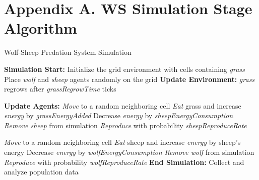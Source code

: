 \documentclass[12pt,a4paper]{article}
\begin{document}
\section*{Appendix A. WS Simulation Stage Algorithm}
\begin{algorithm}[!]
    \caption{Wolf-Sheep Predation System Simulation}\label{alg:wolf-sheep}
    \begin{algorithmic}[1]   
    \State \textbf{Simulation Start:}
    \State Initialize the grid environment with cells containing \textit{grass}
    \State Place \textit{wolf} and \textit{sheep} agents randomly on the grid
        \State \textbf{Update Environment:}
                \State \textit{grass} regrows after \textit{grassRegrowTime} ticks
            \EndIf
        \EndFor
        
        \State \textbf{Update Agents:}
            \State \textit{Move} to a random neighboring cell
                \State \textit{Eat} grass and increase \textit{energy} by \textit{grassEnergyAdded}
            \EndIf
            \State Decrease \textit{energy} by \textit{sheepEnergyConsumption}
                \State \textit{Remove sheep} from simulation
            \EndIf
                \State \textit{Reproduce} with probability \textit{sheepReproduceRate}
            \EndIf
        \EndFor
        
            \State \textit{Move} to a random neighboring cell
                \State \textit{Eat} sheep and increase \textit{energy} by sheep's energy
            \EndIf
            \State Decrease \textit{energy} by \textit{wolfEnergyConsumption}
                \State \textit{Remove wolf} from simulation
            \EndIf
                \State \textit{Reproduce} with probability \textit{wolfReproduceRate}
            \EndIf
        \EndFor
    \EndFor
    \State \textbf{End Simulation:} Collect and analyze population data
    \end{algorithmic}
\end{algorithm}

\end{document}
